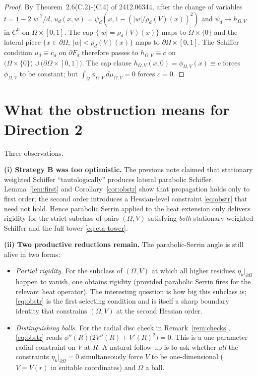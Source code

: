 \documentclass[11pt]{article}
\newcommand{\Om}{\Omega}
\newcommand{\1}{\mathbf 1}
\begin{document}
\begin{proof}
By Theorem~2.6(C.2)-(C.4) of 2412.06344, after the change of variables
$t=1-2|w|^2/d$, $u_d(x,w)=\psi_d(x,1-(|w|/\rho_d(V)(x))^2)$ and
$\psi_d\to h_{\Om,V}$ in $C^0$ on $\Om\times[0,1]$. The cap
$\{|w|=\rho_d(V)(x)\}$ maps to $\Om\times\{0\}$ and the lateral piece
$\{x\in\partial\Om,\ |w|<\rho_d(V)(x)\}$ maps to
$\partial\Om\times[0,1]$. The Schiffer condition $u_d\equiv c_d$ on
$\partial F_d$ therefore passes to $h_{\Om,V}\equiv c$ on
$\bigl(\Om\times\{0\}\bigr)\cup\bigl(\partial\Om\times[0,1]\bigr)$.
The cap clause $h_{\Om,V}(x,0)=\phi_{\Om,V}(x)\equiv c$ forces
$\phi_{\Om,V}$ to be constant; but $\int_\Om\phi_{\Om,V}\,d\mu_{\Om,V}=0$
forces $c=0$.
\end{proof}

\section{What the obstruction means for Direction 2}

Three observations.

\medskip
\noindent\textbf{(i) Strategy B was too optimistic.} The previous note
claimed that stationary weighted Schiffer ``tautologically'' produces
lateral parabolic Schiffer. Lemma~\ref{lem:first} and Corollary~\ref{cor:obstr}
show that propagation holds only to first order; the second order
introduces a Hessian-level constraint \eqref{eq:obstr} that need not
hold. Hence parabolic Serrin applied to the heat extension only
delivers rigidity for the strict subclass of pairs $(\Om,V)$
satisfying \emph{both} stationary weighted Schiffer and the full tower
\eqref{eq:eta-tower}.

\medskip
\noindent\textbf{(ii) Two productive reductions remain.} The
parabolic-Serrin angle is still alive in two forms:
\begin{itemize}[leftmargin=*]
    \item \emph{Partial rigidity.} For the subclass of $(\Om,V)$ at
    which all higher residues $\eta_k|_{\partial\Om}$ happen to vanish,
    one obtains rigidity (provided parabolic Serrin fires for the
    relevant heat operator). The interesting question is how big this
    subclass is; \eqref{eq:obstr} is the first selecting condition and
    is itself a sharp boundary identity that constrains $(\Om,V)$ at
    the second Hessian order.
    \item \emph{Distinguishing balls.} For the radial disc check in
    Remark~\ref{rem:checks}, \eqref{eq:obstr} reads
    $\phi''(R)\bigl(2V''(R)+V'(R)^2\bigr)=0$. This is a one-parameter
    radial constraint on $V$ at $R$. A natural follow-up is to ask
    whether \emph{all} the constraints $\eta_k|_{\partial\Om}=0$
    simultaneously force $V$ to be one-dimensional ($V=V(r)$ in
    suitable coordinates) and $\Om$ a ball.
\end{itemize}
\end{document}
